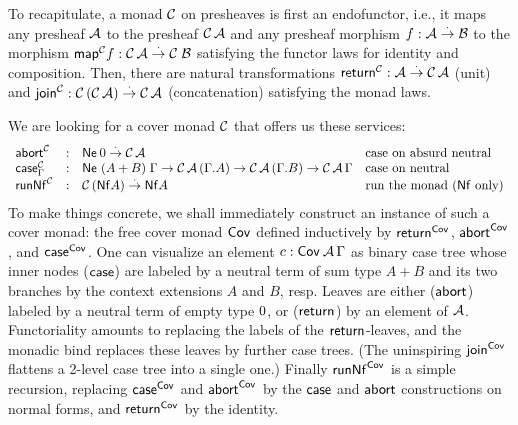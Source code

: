 \documentclass[a4paper,USenglish,cleveref, autoref]{lipics-v2019}
\begin{document}
To recapitulate, a monad $\C$ on presheaves is first an endofunctor,
i.e., it maps any presheaf $\A$ to the presheaf $\C\,\A$ and any
presheaf morphism $f : \A \todot \B$ to the morphism
$\tmap[\C]f: \C\,\A \todot \C\;\B$ satisfying the functor laws for
identity and composition.  Then, there are natural transformations
$\treturn[\C] : \A \todot \C\,\A$ (unit) and
$\tjoin[\C] : \C\,(\C\,\A) \todot \C\,\A$ (concatenation) satisfying
the monad laws.

We are looking for a cover monad $\C$ that
offers us these services:
\[
\begin{array}{lcl@{\quad}l}
\tabort^\C & : & \tNe\, \tyzero \todot \C\,\A
  & \mbox{case on absurd neutral} \\
\tcase^\C_\Gamma & : & \Ne {(A + B)} \Gamma
  \to \C\,\A\,(\cext \Gamma A)
  \to \C\,\A\,(\cext \Gamma B)
  \to \C\,\A\,\Gamma
  & \mbox{case on neutral} \\
\trunNf[\C] & : & \C\,(\tNf A) \todot \tNf A
  & \mbox{run the monad ($\tNf$ only)} \\
\end{array}
\]
To make things concrete,
we shall immediately construct an instance of such a cover monad:
the free cover monad
$\Cov$ defined inductively by $\treturn[\Cov]$, $\tabort^{\Cov}$, and
$\tcase^{\Cov}$.  One can visualize an element $c : \Cov\,\A\,\Gamma$ as
binary case tree whose inner nodes ($\tcase$) are labeled by a neutral term
of sum type $A+B$ and its two branches by the context extensions $A$
and $B$, resp.  Leaves are either ($\tabort$)
labeled by a neutral term of empty type $\tyzero$,
or ($\treturn$) by an element of $\A$.  Functoriality amounts to
replacing the labels of the $\treturn$-leaves, and the monadic bind replaces
these leaves by further case trees.  (The uninspiring $\tjoin[\Cov]$
flattens a 2-level case tree into a single one.)
Finally $\trunNf[\Cov]$ is a simple recursion, replacing $\tcase^{\Cov}$
and $\tabort^{\Cov}$
by the $\tcase$ and $\tabort$ constructions on normal forms, and
$\treturn[\Cov]$ by the identity.
\end{document}
